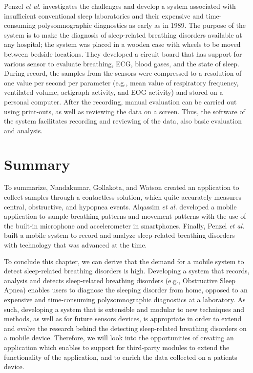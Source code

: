 Penzel \textit{et al.} \cite{mobilesleeplab} investigates the challenges and develop a system associated with insufficient conventional sleep laboratories and their expensive and time-consuming polysomnographic diagnostics as early as in 1989. The purpose of the system is to make the diagnosis of sleep-related breathing disorders available at any hospital; the system was placed in a wooden case with wheels to be moved between bedside locations. They developed a circuit board that has support for various sensor to evaluate breathing, ECG, blood gases, and the state of sleep. During record, the samples from the sensors were compressed to a resolution of one value per second per parameter (e.g., mean value of respiratory frequency, ventilated volume, actigraph activity, and EOG activity) and stored on a personal computer. After the recording, manual evaluation can be carried out using print-outs, as well as reviewing the data on a screen. Thus, the software of the system facilitates recording and reviewing of the data, also basic evaluation and analysis. 

\section{Summary}

To summarize, Nandakumar, Gollakota, and Watson created an application to collect samples through a contactless solution, which quite accurately measures central, obstructive, and hypopnea events. Alqassim \textit{et al.} developed a mobile application to sample breathing patterns and movement patterns with the use of the built-in microphone and accelerometer in smartphones. Finally, Penzel \textit{et al.} built a mobile system to record and analyze sleep-related breathing disorders with technology that was advanced at the time.

To conclude this chapter, we can derive that the demand for a mobile system to detect sleep-related breathing disorders is high. Developing a system that records, analysis and detects sleep-related breathing disorders (e.g., Obstructive Sleep Apnea) enables users to diagnose the sleeping disorder from home, opposed to an expensive and time-consuming polysomnographic diagnostics at a laboratory. As such, developing a system that is extensible and modular to new techniques and methods, as well as for future sensors devices, is appropriate in order to extend and evolve the research behind the detecting sleep-related breathing disorders on a mobile device. Therefore, we will look into the opportunities of creating an application which enables to support for third-party modules to extend the functionality of the application, and to enrich the data collected on a patients device.

